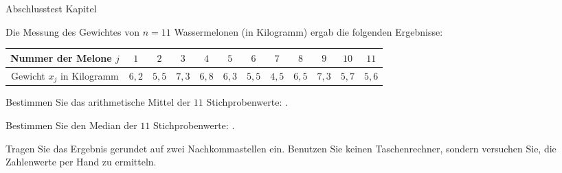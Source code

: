 \begin{MTest}{Abschlusstest Kapitel }
\begin{MExercise}
\end{MExercise}


\begin{MExercise}
Die Messung des Gewichtes von $n=11$ Wassermelonen (in Kilogramm) ergab die folgenden Ergebnisse:

\begin{center}
\begin{tabular}{|c|c|c|c|c|c|c|c|c|c|c|c|}
\hline
Nummer der Melone $j$ & $1$ & $2$ & $3$ & $4$ & $5$ & $6$ & $7$ & $8$ & $9$ & $10$ & $11$ \\ \hline
Gewicht $x_j$ in Kilogramm & $6,2$ &  $5,5$ & $7,3$ & $6,8$ & $6,3$ & $5,5$ & $4,5$ & $6,5$ & $7,3$ & $5,7$ & $5,6$\\ \hline
\end{tabular}
\end{center}

\begin{MExerciseItems}
\item{Bestimmen Sie das arithmetische Mittel der $11$ Stichprobenwerte: .}
\item{Bestimmen Sie den Median der $11$ Stichprobenwerte: .}
\end{MExerciseItems}
Tragen Sie das Ergebnis gerundet auf zwei Nachkommastellen ein. Benutzen Sie keinen Taschenrechner, sondern versuchen Sie, die Zahlenwerte per Hand zu ermitteln.
\end{MExercise}


\end{MTest}

\newpage
\MPrintIndex


